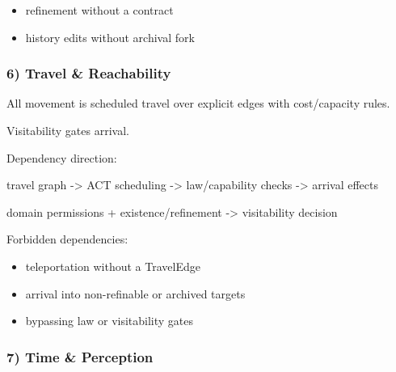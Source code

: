 \documentclass[9pt,a4paper,openany]{book}
\begin{document}
\begin{itemize}
\item refinement without a contract
\end{itemize}


\begin{itemize}
\item history edits without archival fork
\end{itemize}





\subsubsection{6) Travel \& Reachability}


All movement is scheduled travel over explicit edges with cost/\allowbreak{}capacity rules.\allowbreak{}



Visitability gates arrival.\allowbreak{}






Dependency direction:



travel graph -\allowbreak{}> ACT scheduling -\allowbreak{}> law/\allowbreak{}capability checks -\allowbreak{}> arrival effects



domain permissions + existence/\allowbreak{}refinement -\allowbreak{}> visitability decision






Forbidden dependencies:



\begin{itemize}
\item teleportation without a TravelEdge
\end{itemize}


\begin{itemize}
\item arrival into non-\allowbreak{}refinable or archived targets
\end{itemize}


\begin{itemize}
\item bypassing law or visitability gates
\end{itemize}





\subsubsection{7) Time \& Perception}
\end{document}
